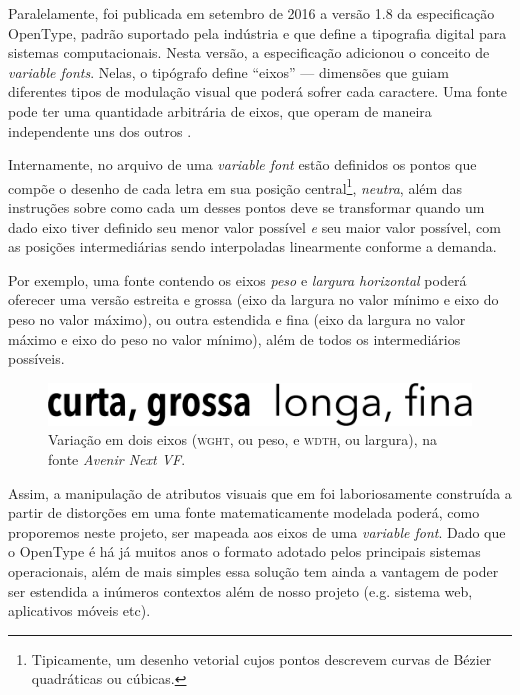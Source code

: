 \documentclass[a4paper,11pt,titlepage,singlespacing]{article}
\begin{document}
    Paralelamente, foi publicada em setembro de 2016 a versão 1.8 da especificação OpenType, padrão suportado pela indústria e que define a tipografia digital para sistemas computacionais. Nesta versão, a especificação adicionou o conceito de \textit{variable fonts}. Nelas, o tipógrafo define ``eixos'' — dimensões que guiam diferentes tipos de modulação visual que poderá sofrer cada caractere. Uma fonte pode ter uma quantidade arbitrária de eixos, que operam de maneira independente uns dos outros \cite{varfontssepcs}. 
    
    Internamente, no arquivo de uma \textit{variable font} estão definidos os pontos que compõe o desenho de cada letra em sua posição central\footnote{Tipicamente, um desenho vetorial cujos pontos descrevem curvas de Bézier quadráticas ou cúbicas.}, \textit{neutra}, além das instruções sobre como cada um desses pontos deve se transformar quando um dado eixo tiver definido seu menor valor possível \textit{e} seu maior valor possível, com as posições intermediárias sendo interpoladas linearmente conforme a demanda.
    
    Por exemplo, uma fonte contendo os eixos \textit{peso} e \textit{largura horizontal} poderá oferecer uma versão estreita e grossa (eixo da largura no valor mínimo e eixo do peso no valor máximo), ou outra estendida e fina (eixo da largura no valor máximo e eixo do peso no valor mínimo), além de todos os intermediários possíveis.


    
    \begin{figure}[!ht]
    
    \centering
    \label{fig:exemplo}
    \captionsetup{width=\textwidth}
        \includegraphics[width=\textwidth]{fig/avenir-2.png}
        
    \caption{Variação em dois eixos (\textsc{wght}, ou peso, e \textsc{wdth}, ou largura), na fonte \textit{Avenir Next VF}.}
\end{figure}

	Assim, a manipulação de atributos visuais que em  foi laboriosamente construída a partir de distorções em uma fonte matematicamente modelada poderá, como proporemos neste projeto, ser mapeada aos eixos de uma \textit{variable font}. Dado que o OpenType é há já muitos anos o formato adotado pelos principais sistemas operacionais, além de mais simples essa solução tem ainda a vantagem de poder ser estendida a inúmeros contextos além de nosso projeto (e.g. sistema web, aplicativos móveis etc).
\end{document}
